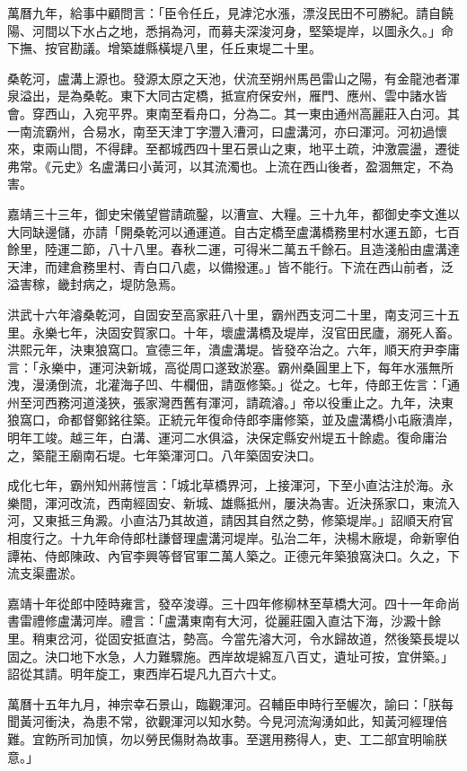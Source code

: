 萬曆九年，給事中顧問言：「臣令任丘，見滹沱水漲，漂沒民田不可勝紀。請自饒陽、河間以下水占之地，悉捐為河，而募夫深浚河身，堅築堤岸，以圖永久。」命下撫、按官勘議。增築雄縣橫堤八里，任丘東堤二十里。

桑乾河，盧溝上源也。發源太原之天池，伏流至朔州馬邑雷山之陽，有金龍池者渾泉溢出，是為桑乾。東下大同古定橋，抵宣府保安州，雁門、應州、雲中諸水皆會。穿西山，入宛平界。東南至看舟口，分為二。其一東由通州高麗莊入白河。其一南流霸州，合易水，南至天津丁字灃入漕河，曰盧溝河，亦曰渾河。河初過懷來，束兩山間，不得肆。至都城西四十里石景山之東，地平土疏，沖激震盪，遷徙弗常。《元史》名盧溝曰小黃河，以其流濁也。上流在西山後者，盈涸無定，不為害。

嘉靖三十三年，御史宋儀望嘗請疏鑿，以漕宣、大糧。三十九年，都御史李文進以大同缺邊儲，亦請「開桑乾河以通運道。自古定橋至盧溝橋務里村水運五節，七百餘里，陸運二節，八十八里。春秋二運，可得米二萬五千餘石。且造淺船由盧溝達天津，而建倉務里村、青白口八處，以備撥運。」皆不能行。下流在西山前者，泛溢害稼，畿封病之，堤防急焉。

洪武十六年濬桑乾河，自固安至高家莊八十里，霸州西支河二十里，南支河三十五里。永樂七年，決固安賀家口。十年，壞盧溝橋及堤岸，沒官田民廬，溺死人畜。洪熙元年，決東狼窩口。宣德三年，潰盧溝堤。皆發卒治之。六年，順天府尹李庸言：「永樂中，運河決新城，高從周口遂致淤塞。霸州桑圓里上下，每年水漲無所洩，漫湧倒流，北灌海子凹、牛欄佃，請亟修築。」從之。七年，侍郎王佐言：「通州至河西務河道淺狹，張家灣西舊有渾河，請疏濬。」帝以役重止之。九年，決東狼窩口，命都督鄭銘往築。正統元年復命侍郎李庸修築，並及盧溝橋小屯廠潰岸，明年工竣。越三年，白溝、運河二水俱溢，決保定縣安州堤五十餘處。復命庸治之，築龍王廟南石堤。七年築渾河口。八年築固安決口。

成化七年，霸州知州蔣愷言：「城北草橋界河，上接渾河，下至小直沽注於海。永樂間，渾河改流，西南經固安、新城、雄縣抵州，屢決為害。近決孫家口，東流入河，又東抵三角澱。小直沽乃其故道，請因其自然之勢，修築堤岸。」詔順天府官相度行之。十九年命侍郎杜謙督理盧溝河堤岸。弘治二年，決楊木廠堤，命新寧伯譚祐、侍郎陳政、內官李興等督官軍二萬人築之。正德元年築狼窩決口。久之，下流支渠盡淤。

嘉靖十年從郎中陸時雍言，發卒浚導。三十四年修柳林至草橋大河。四十一年命尚書雷禮修盧溝河岸。禮言：「盧溝東南有大河，從麗莊園入直沽下海，沙澱十餘里。稍東岔河，從固安抵直沽，勢高。今當先濬大河，令水歸故道，然後築長堤以固之。決口地下水急，人力難驟施。西岸故堤綿亙八百丈，遺址可按，宜併築。」詔從其請。明年旋工，東西岸石堤凡九百六十丈。

萬曆十五年九月，神宗幸石景山，臨觀渾河。召輔臣申時行至幄次，諭曰：「朕每聞黃河衝決，為患不常，欲觀渾河以知水勢。今見河流洶湧如此，知黃河經理倍難。宜飭所司加慎，勿以勞民傷財為故事。至選用務得人，吏、工二部宜明喻朕意。」

